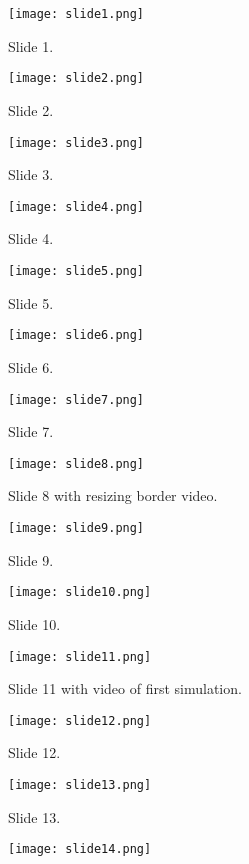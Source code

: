 \documentclass[write-up.tex]{subfiles}
\begin{document}
\begin{appendices}
\begin{figure}[h]
\centering
\texttt{[image: slide1.png]}
\caption{Slide 1.}
\end{figure}
\begin{figure}[h]
\centering
\texttt{[image: slide2.png]}
\caption{Slide 2.}
\end{figure}
\begin{figure}[h]
\centering
\texttt{[image: slide3.png]}
\caption{Slide 3.}
\end{figure}
\begin{figure}[h]
\centering
\texttt{[image: slide4.png]}
\caption{Slide 4.}
\end{figure}
\begin{figure}[h]
\centering
\texttt{[image: slide5.png]}
\caption{Slide 5.}
\end{figure}
\begin{figure}[h]
\centering
\texttt{[image: slide6.png]}
\caption{Slide 6.}
\end{figure}
\begin{figure}[h]
\centering
\texttt{[image: slide7.png]}
\caption{Slide 7.}
\end{figure}
\begin{figure}[h]
\centering
\texttt{[image: slide8.png]}
\caption{Slide 8 with resizing border video.}
\end{figure}
\begin{figure}[h]
\centering
\texttt{[image: slide9.png]}
\caption{Slide 9.}
\end{figure}
\begin{figure}[h]
\centering
\texttt{[image: slide10.png]}
\caption{Slide 10.}
\end{figure}
\begin{figure}[h]
\centering
\texttt{[image: slide11.png]}
\caption{Slide 11 with video of first simulation.}
\end{figure}
\begin{figure}[h]
\centering
\texttt{[image: slide12.png]}
\caption{Slide 12.}
\end{figure}
\begin{figure}[h]
\centering
\texttt{[image: slide13.png]}
\caption{Slide 13.}
\end{figure}
\begin{figure}[h]
\centering
\texttt{[image: slide14.png]}

\end{figure}
\end{appendices}
\end{document}
